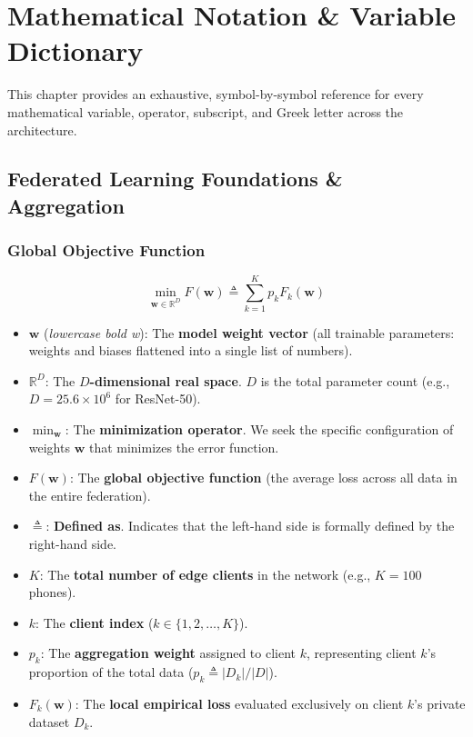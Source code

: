 \documentclass[11pt,a4paper,titlepage]{report}
\begin{document}
\chapter{Mathematical Notation \& Variable Dictionary}
\label{chap:math_dictionary}

This chapter provides an exhaustive, symbol-by-symbol reference for every mathematical variable, operator, subscript, and Greek letter across the architecture.

\section{Federated Learning Foundations \& Aggregation}

\subsection{Global Objective Function}
\begin{equation}
    \min_{\mathbf{w} \in \mathbb{R}^D} F(\mathbf{w}) \triangleq \sum_{k=1}^K p_k F_k(\mathbf{w})
\end{equation}
\begin{itemize}[leftmargin=*]
    \item $\mathbf{w}$ (\textit{lowercase bold w}): The \textbf{model weight vector} (all trainable parameters: weights and biases flattened into a single list of numbers).
    \item $\mathbb{R}^D$: The \textbf{$D$-dimensional real space}. $D$ is the total parameter count (e.g., $D = 25.6 \times 10^6$ for ResNet-50).
    \item $\min_{\mathbf{w}}$: The \textbf{minimization operator}. We seek the specific configuration of weights $\mathbf{w}$ that minimizes the error function.
    \item $F(\mathbf{w})$: The \textbf{global objective function} (the average loss across all data in the entire federation).
    \item $\triangleq$: \textbf{Defined as}. Indicates that the left-hand side is formally defined by the right-hand side.
    \item $K$: The \textbf{total number of edge clients} in the network (e.g., $K = 100$ phones).
    \item $k$: The \textbf{client index} ($k \in \{1, 2, \dots, K\}$).
    \item $p_k$: The \textbf{aggregation weight} assigned to client $k$, representing client $k$'s proportion of the total data ($p_k \triangleq |D_k| / |D|$).
    \item $F_k(\mathbf{w})$: The \textbf{local empirical loss} evaluated exclusively on client $k$'s private dataset $D_k$.
\end{itemize}
\end{document}
